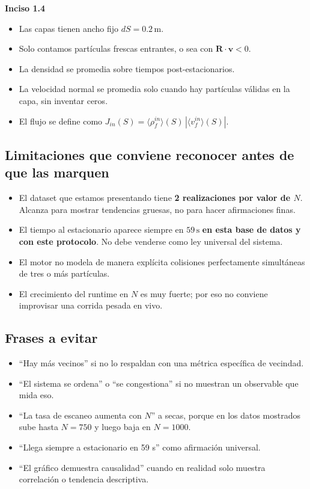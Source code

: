 \documentclass[11pt]{article}
\newcommand{\sectionbox}[1]{
  \vspace{0.4em}
  {\colorbox{tplight}{\parbox{\dimexpr\linewidth-2\fboxsep\relax}{\textbf{\color{tpblue}#1}}}}
  \vspace{0.35em}
}
\begin{document}
\sectionbox{Inciso 1.4}
\begin{itemize}
  \item Las capas tienen ancho fijo $dS=0.2\,\mathrm{m}$.
  \item Solo contamos part\'iculas frescas entrantes, o sea con $\bm R\cdot\bm v<0$.
  \item La densidad se promedia sobre tiempos post-estacionarios.
  \item La velocidad normal se promedia solo cuando hay part\'iculas v\'alidas en la capa, sin inventar ceros.
  \item El flujo se define como $J_{in}(S)=\langle \rho_f^{in}\rangle(S)\,|\langle v_f^{in}\rangle(S)|$.
\end{itemize}

\subsection{Limitaciones que conviene reconocer antes de que las marquen}

\begin{itemize}
  \item El dataset que estamos presentando tiene \textbf{2 realizaciones por valor de $N$}. Alcanza para mostrar tendencias gruesas, no para hacer afirmaciones finas.
  \item El tiempo al estacionario aparece siempre en $59\,\mathrm{s}$ \textbf{en esta base de datos y con este protocolo}. No debe venderse como ley universal del sistema.
  \item El motor no modela de manera expl\'icita colisiones perfectamente simult\'aneas de tres o m\'as part\'iculas.
  \item El crecimiento del runtime en $N$ es muy fuerte; por eso no conviene improvisar una corrida pesada en vivo.
\end{itemize}

\subsection{Frases a evitar}

\begin{itemize}
  \item ``Hay m\'as vecinos'' si no lo respaldan con una m\'etrica espec\'ifica de vecindad.
  \item ``El sistema se ordena'' o ``se congestiona'' si no muestran un observable que mida eso.
  \item ``La tasa de escaneo aumenta con $N$'' a secas, porque en los datos mostrados sube hasta $N=750$ y luego baja en $N=1000$.
  \item ``Llega siempre a estacionario en 59 s'' como afirmaci\'on universal.
  \item ``El gr\'afico demuestra causalidad'' cuando en realidad solo muestra correlaci\'on o tendencia descriptiva.
\end{itemize}
\end{document}
